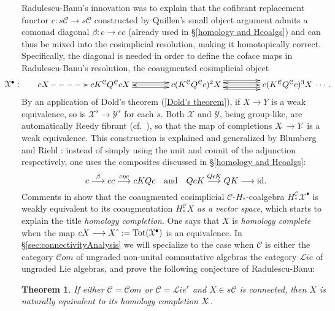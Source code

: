 \documentclass[11pt]{amsart} \renewcommand{\baselinestretch}{1.4}
\theoremstyle{plain}
\newtheorem{thm}{Theorem}[section]
\theoremstyle{definition}
\renewcommand{\to}{\longrightarrow}
\newcommand{\scrL}{\mathscr{L}}
\newcommand{\scrC}{\mathscr{C}}
\newcommand{\calY}{\mathcal{Y}}
\newcommand{\calx}{\mathcal{X}}
\newcommand{\calc}{\mathcal{C}}
\newcommand{\citeBOX}[2][]{\cite[\mbox{#1}]{#2}}
\newcommand{\algs}{{\scrC\!\textit{om}}}
\newcommand{\liealgs}{{\scrL\!\textit{ie}}}
\newcommand{\restliealgs}{{\scrL\!\textit{ie}^\textit{r}}}
\newcommand{\algcat}{{\calc}}%
\begin{document}
\begin{Pi-algebras and cohomology algebras}
Radulescu-Banu's innovation was to explain that the cofibrant replacement functor $c:s\calc\to s\calc$ constructed by Quillen's small object argument \cite{QuillenHomAlg.pdf} admits a comonad diagonal $\beta:c\to cc$  (already used in \S\ref{homology and Hcoalgs}) and can thus be mixed into the cosimplicial resolution, making it homotopically correct. Specifically, the diagonal is needed in order  to define the coface maps in Radulescu-Banu's resolution, the coaugmented cosimplicial object
\[\makebox[0cm][r]{\,$\calx^\bullet:\qquad $}\vcenter{
\def\labelstyle{\scriptstyle}
\xymatrix@C=1.5cm@1{
cX\,
\ar@{-->}[r]
&
\,cK^{\calc}Q^{\calc}cX\,
\ar[r];[]
&
\,c(K^{\calc}Q^{\calc}c)^2X\,
\ar@<-.65ex>[l];[]
\ar@<+.65ex>[l];[]
\ar@<+.65ex>[r];[]
\ar@<-.65ex>[r];[]
&
\,c(K^{\calc}Q^{\calc}c)^3X\,\makebox[0cm][l]{\,$\cdots. $}
\ar[l];[]
\ar@<-1.3ex>[l];[]
\ar@<+1.3ex>[l];[]
}}\]
By an application of Dold's theorem (\ref{Dold's theorem}), if $X\to Y$ is a weak equivalence, so is $\calx^s\to\calY^s$ for each $s$. Both $\calx$ and $\calY$, being group-like,  are automatically Reedy fibrant (cf.\ \citeBOX[{X.4.9}]{YellowMonster}), so that the map of completions $X\hat{\ }\to Y\hat{\ }$ is a weak equivalence.
This construction is explained and generalized by Blumberg and Riehl \citeBOX[\S4]{BlumRiehlResolutions.pdf}: instead of simply using the unit and counit of the adjunction respectively, one uses the composites discussed in \S\ref{homology and Hcoalgs}:
\[c\overset{\beta}{\to}cc\overset{c\eta c}{\to}cKQc\textup{\quad and\quad }QcK\overset{Q\epsilon K}{\to}QK\to \textup{id}.\]
Comments in \citeBOX[\S4]{BlumRiehlResolutions.pdf}  show that the coaugmented cosimplicial $\calc$-$H_*$-coalgebra $H_*^{\calc}\calx^\bullet$  is weakly equivalent to its coaugmentation $H_*^{\calc}X$ \emph{as a vector space}, which starts to explain  the title \emph{homology completion}. One says that $X$ is \emph{homology complete} when the map $cX\to X\hat{\ }:=\textup{Tot}(\calx^\bullet)$ is an equivalence.
In \S\ref{sec:connectivityAnalysis} we will specialize to the case when $\algcat$ is either the category $\algs$  of ungraded non-unital commutative algebras the category $\liealgs$ of ungraded Lie algebras, and prove the following conjecture of Radulescu-Banu:
\begin{thm}
\label{completenesstheorem}
If either $\algcat=\algs$ or $\algcat=\restliealgs$ and $X\in s\algcat$ is connected, then $X$ is naturally equivalent to its homology completion $X\hat{\ }$.
\end{thm}


\end{Pi-algebras and cohomology algebras}
\end{document}
